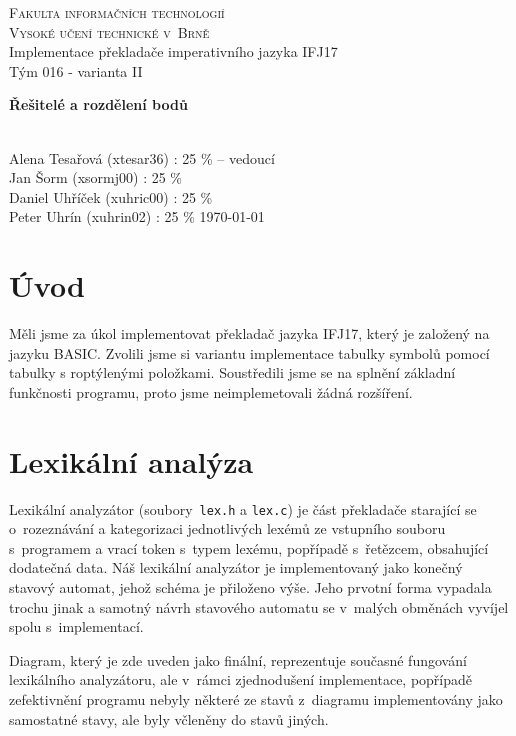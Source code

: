 \documentclass[11pt,a4paper]{article}
\author{Alena Tesařová}
\begin{document}
\begin{titlepage}

\begin{center}
\Huge
\textsc{Fakulta informačních technologií\\
Vysoké učení technické v~Brně}\\
\Huge Implementace překladače imperativního jazyka IFJ17
\\
\medskip
{\Large Tým 016 - varianta II}
\end{center}


\begin{LARGE}
\noindent
\textbf{ Řešitelé a rozdělení bodů } \\ \\
\end{LARGE}
{\Large 
Alena Tesařová (xtesar36) : 25 \% -- vedoucí\\
Jan Šorm (xsormj00) : 25 \% \\
Daniel Uhříček (xuhric00) : 25 \% \\
Peter Uhrín (xuhrin02) : 25 \% 
}
\hfill
\today
\end{titlepage}



\section{Úvod}
Měli jsme za úkol implementovat překladač jazyka IFJ17, který je založený na jazyku BASIC. Zvolili jsme si variantu implementace tabulky symbolů pomocí tabulky s roptýlenými položkami. Soustředili jsme se na splnění základní funkčnosti programu, proto jsme neimplemetovali žádná rozšíření.

\section{Lexikální analýza}
Lexikální analyzátor (soubory\ \verb|lex.h| a \verb|lex.c|) je část překladače starající se o~rozeznávání a kategorizaci jednotlivých lexémů ze vstupního souboru s~programem a vrací token s~typem lexému, popřípadě s~řetězcem, obsahující dodatečná data. Náš lexikální analyzátor je implementovaný jako konečný stavový automat, jehož schéma je přiloženo výše. Jeho prvotní forma vypadala trochu jinak a samotný návrh stavového automatu se v~malých obměnách vyvíjel spolu s~implementací.

Diagram, který je zde uveden jako finální, reprezentuje současné fungování lexikálního analyzátoru, ale v~rámci zjednodušení implementace, popřípadě zefektivnění programu nebyly některé ze stavů z~diagramu implementovány jako samostatné stavy, ale byly včleněny do stavů jiných.
\end{document}
